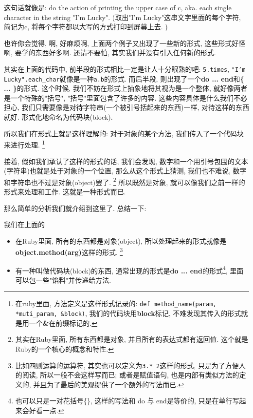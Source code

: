 这句话就像是: do the action of printing the upper case of c, aka. each single character in the string "I'm Lucky". (取出"I'm Lucky"这串文字里面的每个字符, 简记为c, 将每个字符都以大写的方式打印到屏幕上去. )

也许你会觉得, 啊, 好麻烦啊, 上面两个例子又出现了一些新的形式, 这些形式好怪啊, 要学的东西好多啊. 还请不要怕, 其实我们并没有引入任何新的形式. 

其实在上面的代码中, 前半段的形式相比一定是让人十分眼熟的吧: \texttt{5.times}, \texttt{"I'm Lucky".each_char}就像是一种\texttt{a.b}的形式. 而后半段, 则出现了一个\textbf{do ... end}和\textbf{\{ ... \}}的形式. 这个时候, 我们不妨在形式上抽象地将其视为是一个整体, 就好像两者是一个特殊的"括号", "括号"里面包含了许多的内容. 这些内容具体是什么我们不必担心, 我们只需要像是对待字符串(一个被引号括起来的东西)一样, 对待这样的东西就好. 形式化地命名为代码块(block).


所以我们在形式上就是这样理解的: 对于对象的某个方法, 我们传入了一个代码块来进行处理. \footnote{在ruby里面, 方法定义是这样形式记录的: \texttt{def method_name(param, *muti_param, &block)}, 我们的代码块用\textbf{block}标记, 不难发现其传入的形式就是用一个\textbf{\&}在前缀标记的. }

接着, 假如我们承认了这样的形式的话, 我们会发现, 数字和一个用引号包围的文本(字符串)也就是处于对象的一个位置, 那么从这个形式上猜测, 我们也不难说, 数字和字符串也不过是对象(object)罢了. \footnote{其实在Ruby里面, 所有东西都是对象, 并且所有的表达式都有返回值. 这个就是Ruby的一个核心的概念和特性. } 所以既然是对象, 就可以像我们之前一样的形式来处理和工作. 这就是一种形式而已. 

那么简单的分析我们就介绍到这里了. 总结一下: 

我们在上面的

\begin{itemize}
  \item 在Ruby里面, 所有的东西都是对象(object), 所以处理起来的形式就像是\textbf{object.method(arg)}这样的形式. \footnote{比如四则运算的运算符, 其实也可以定义为\texttt{3.* 2}这样的形式, 只是为了方便人的阅读, 所以一般不会这样写而已; 或者是赋值语句, 也是内部有类似方法的定义的, 并且为了最后的美观提供了一个额外的写法而已. }
  \item 有一种叫做代码块(block)的东西, 通常出现的形式是\textbf{do ... end}的形式\footnote{也可以只是一对花括号\{\}, 这样的写法和 do 与 end是等价的, 只是在单行写起来会好看一点. }, 里面可以包一些"馅料"并传递给方法. 
\end{itemize}

